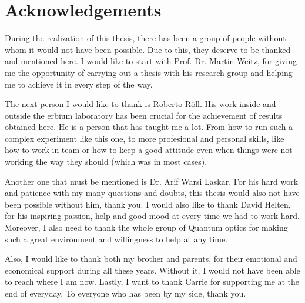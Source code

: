 \chapter{Acknowledgements}
\label{sec:ack}

During the realization of this thesis, there has been a group of people without whom it would not have been possible. Due to this, they deserve to be thanked and mentioned here. I would like to start with Prof. Dr. Martin Weitz, for giving me the opportunity of carrying out a thesis with his research group and helping me to achieve it in every step of the way.

The next person I would like to thank is Roberto R\"oll. His work inside and outside the erbium laboratory has been crucial for the achievement of results obtained here. He is a person that has taught me a lot. From how to run such a complex experiment like this one, to more profesional and personal skills, like how to work in team or how to keep a good attitude even when things were not working the way they should (which was in most cases).

Another one that must be mentioned is Dr. Arif Warsi Laskar. For his hard work and patience with my many questions and doubts, this thesis would also not have been possible without him, thank you. I would also like to thank David Helten, for his inspiring passion, help and good mood at every time we had to work hard. Moreover, I also need to thank the whole group of Quantum optics for making such a great environment and willingness to help at any time.

Also, I would like to thank both my brother and parents, for their emotional and economical support during all these years. Without it, I would not have been able to reach where I am now. Lastly, I want to thank Carrie for supporting me at the end of everyday. To everyone who has been by my side, thank you.



